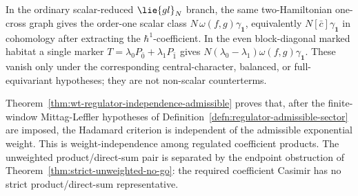 \begin{rmk}\label{rmk:actual-finite-window-scalar-gate-boundary}
  In the ordinary scalar-reduced \(\lie{gl}_N\) branch, the same
  two-Hamiltonian one-cross graph gives the order-one scalar class
  \(N\,\omega(f,g)\gamma_{\mathbf 1}\), equivalently
  \(N[\bar c]\gamma_{\mathbf 1}\) in cohomology after extracting the
  \(\hbar^1\)-coefficient.  In the even block-diagonal marked habitat a
  single marker
  \(T=\lambda_0P_{\bar0}+\lambda_1P_{\bar1}\) gives
  \(N(\lambda_0-\lambda_1)\omega(f,g)\gamma_{\mathbf 1}\).  These vanish
  only under the corresponding central-character, balanced, or
  full-equivariant hypotheses; they are not non-scalar counterterms.
\end{rmk}

\begin{rmk}\label{rmk:hadamard-regulator-independence}
  Theorem~\ref{thm:wt-regulator-independence-admissible} proves that,
  after the finite-window Mittag-Leffler hypotheses of
  Definition~\ref{defn:regulator-admissible-sector} are imposed, the
  Hadamard criterion is independent of the admissible exponential
  weight.  This is weight-independence among regulated coefficient
  products.  The unweighted product/direct-sum pair is separated by the
  endpoint obstruction of Theorem~\ref{thm:strict-unweighted-no-go}: the
  required coefficient Casimir has no strict product/direct-sum
  representative.
\end{rmk}
